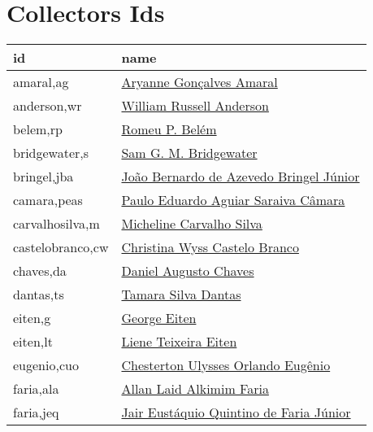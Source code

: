 \chapter{Collectors Ids}\label{appendix:collectors_ids}

\lipsum[50]

\begin{longtable}{l l}
	  id & name \\
      \hline
      amaral,ag           & \href{http://lattes.cnpq.br/0553088328180564}{Aryanne Gonçalves Amaral} \\
anderson,wr         & \hyperlink{https://plants.jstor.org/stable/10.5555/al.ap.person.bm000000177}{William Russell Anderson} \\
belem,rp            & \hyperlink{https://plants.jstor.org/stable/10.5555/al.ap.person.bm000026951}{Romeu P. Belém} \\
bridgewater,s       & \hyperlink{https://plants.jstor.org/stable/10.5555/al.ap.person.bm000120171}{Sam G. M. Bridgewater} \\
bringel,jba         & \hyperlink{http://lattes.cnpq.br/9359704960057451}{João Bernardo de Azevedo Bringel Júnior} \\
camara,peas         & \hyperlink{http://lattes.cnpq.br/2742831544064073}{Paulo Eduardo Aguiar Saraiva Câmara} \\
carvalhosilva,m     & \hyperlink{http://lattes.cnpq.br/1015868478480965}{Micheline Carvalho Silva} \\
castelobranco,cw    & \hyperlink{http://lattes.cnpq.br/6129052109183586}{Christina Wyss Castelo Branco} \\
chaves,da           & \hyperlink{http://lattes.cnpq.br/6993370381419092}{Daniel Augusto Chaves} \\
dantas,ts           & \hyperlink{http://lattes.cnpq.br/6233687711682398}{Tamara Silva Dantas} \\
eiten,g             & \hyperlink{https://plants.jstor.org/stable/10.5555/al.ap.person.bm000002352}{George Eiten} \\
eiten,lt            & \hyperlink{https://plants.jstor.org/stable/10.5555/al.ap.person.bm000002353}{Liene Teixeira Eiten} \\
eugenio,cuo         & \hyperlink{http://lattes.cnpq.br/3694741825113110}{Chesterton Ulysses Orlando Eugênio} \\
faria,ala           & \hyperlink{http://lattes.cnpq.br/3988533384771339}{Allan Laid Alkimim Faria} \\
faria,jeq           & \hyperlink{http://lattes.cnpq.br/3214384669945455}{Jair Eustáquio Quintino de Faria Júnior} \\

\end{longtable}
